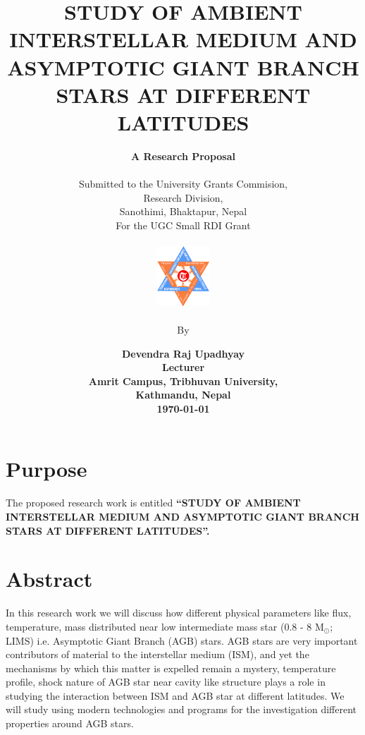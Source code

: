 \documentclass[fleqn,a4paper,12pt,oneside]{article}
\begin{document}
	\title{\bf STUDY OF AMBIENT INTERSTELLAR MEDIUM AND ASYMPTOTIC GIANT BRANCH STARS AT DIFFERENT LATITUDES}
	\author{\textbf{A Research Proposal}
		\\
		\\
		Submitted  to the University Grants Commision,\\Research Division,\\Sanothimi, Bhaktapur, Nepal\\ 
		For the UGC Small RDI Grant 
		\\
		\\
		{\includegraphics[width=2cm]{logo}}
		\\
		\\
		By}
	\vspace{1cm}
	\date{\bf Devendra Raj Upadhyay\\Lecturer\\ Amrit Campus, Tribhuvan University, \\Kathmandu, Nepal\\\vspace{1cm}\today}
	\setlength{\textheight}{23.5cm} \maketitle
	\setlength{\textheight}{23cm}
	\clearpage
	
	\tableofcontents
	\pagebreak
\section{Purpose}
 The proposed research work is entitled {\bf``STUDY OF AMBIENT INTERSTELLAR MEDIUM AND ASYMPTOTIC GIANT BRANCH STARS AT DIFFERENT LATITUDES''.}
\section{Abstract}
In this research work we will discuss how different physical parameters like flux, temperature, mass
distributed near low intermediate mass star (0.8 - 8 M$_{\odot}$; LIMS) i.e. Asymptotic Giant Branch (AGB) stars. AGB stars are very
important contributors of material to the interstellar medium
(ISM), and yet the mechanisms by which this matter is expelled
remain a mystery, temperature profile, shock nature of
AGB star near cavity like structure plays a role in studying the
interaction between ISM and AGB star at  different latitudes. We will study using modern technologies and programs for the investigation different properties around AGB stars. 
\end{document}
